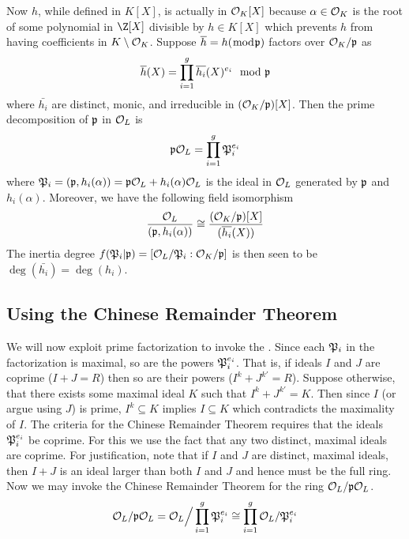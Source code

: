 Now $h$, while defined in $K[X]$, is actually in $\mathcal{O}_K[X]$ because $\alpha\in\mathcal{O}_K$ is the root of some polynomial in $\Z[X]$ divisible by $h\in K[X]$ which prevents $h$ from having coefficients in $K\setminus\mathcal{O}_K$.
Suppose $\overline{h}=h(\bmod\mathfrak{p})$ factors over $\mathcal{O}_K/\mathfrak{p}$ as
\begin{equation}
    \bar{h}(X) = \prod_{i=1}^g \bar{h_i}(X)^{e_i} \mod\i{p}
\end{equation}
where $\bar{h_i}$ are distinct, monic, and irreducible in $(\mathcal{O}_K/\mathfrak{p})[X]$.
Then the prime decomposition of $\mathfrak{p}$ in $\mathcal{O}_L$ is
\begin{equation}
    \mathfrak{p}\mathcal{O}_L = \prod_{i=1}^g \mathfrak{P}_i^{e_i}
\end{equation}
where $\mathfrak{P}_i = (\mathfrak{p},h_i(\alpha)) = \mathfrak{p}\mathcal{O}_L + h_i(\alpha)\mathcal{O}_L$ is the ideal in $\mathcal{O}_L$ generated by $\mathfrak{p}$ and $h_i(\alpha)$.
Moreover, we have the following field isomorphism
\begin{equation}
    \frac{\mathcal{O}_L}{(\mathfrak{p},h_i(\alpha))}\cong\frac{(\mathcal{O}_K/\mathfrak{p})[X]}{(\overline{h_i}(X))}
\end{equation}
The inertia degree $f(\mathfrak{P}_i|\mathfrak{p})=[\mathcal{O}_L/\mathfrak{P}_i:\mathcal{O}_K/\mathfrak{p}]$ is then seen to be $\deg(\bar{h_i}) = \deg(h_i)$.


\subsection{Using the Chinese Remainder Theorem}

We will now exploit prime factorization to invoke the .
Since each $\mathfrak{P}_i$ in the factorization is maximal, so are the powers $\mathfrak{P}_i^{e_i}$.
That is, if ideals $I$ and $J$ are coprime ($I+J=R$) then so are their powers ($I^k+J^{k'}=R$).
Suppose otherwise, that there exists some maximal ideal $K$ such that $I^k+J^{k'}=K$.
Then since $I$ (or argue using $J$) is prime, $I^k\subseteq K$ implies $I\subseteq K$ which contradicts the maximality of $I$.
The criteria for the Chinese Remainder Theorem requires that the ideals $\mathfrak{P}_i^{e_i}$ be coprime.
For this we use the fact that any two distinct, maximal ideals are coprime.
For justification, note that if $I$ and $J$ are distinct, maximal ideals, then $I+J$ is an ideal larger than both $I$ and $J$ and hence must be the full ring.
Now we may invoke the Chinese Remainder Theorem for the ring $\mathcal{O}_L/\mathfrak{p}\mathcal{O}_L$.
\begin{equation}
    \mathcal{O}_L/\mathfrak{p}\mathcal{O}_L
    = \mathcal{O}_L\Big/\prod_{i=1}^g \mathfrak{P}_i^{e_i}
    \cong \prod_{i=1}^g \mathcal{O}_L/\mathfrak{P}_i^{e_i}
\end{equation}

